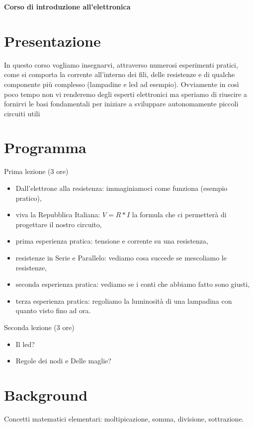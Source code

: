 \documentclass[a4paper,11pt]{article}
\begin{document}
	\pagestyle{empty}
	\begin{flushright}
		\begin{figure}[!h]
		\end{figure}
	\end{flushright}
	\begin{center}
		\textbf{\Huge Corso di introduzione all'elettronica}\\	
	\end{center}

	\section{Presentazione} %
	\label{sec:presentazione}
		In questo corso vogliamo insegnarvi, attraverso numerosi esperimenti pratici, come si comporta la corrente all'interno dei fili, delle resistenze e di qualche componente più complesso (lampadine e led ad esempio). Ovviamente in così poco tempo non vi renderemo degli esperti elettronici ma speriamo di riuscire a fornirvi le basi fondamentali per iniziare a sviluppare autonomamente piccoli circuiti utili 

	\section{Programma} %
	\label{sec:programma}
		\large Prima lezione (3 ore)
		\begin{itemize}
			\item Dall'elettrone alla resistenza: immaginiamoci come funziona (esempio pratico),
			\item viva la Repubblica Italiana: $V=R*I$ la formula che ci permetterà di progettare il nostro circuito,
			\item prima esperienza pratica: tensione e corrente su una resistenza,
			\item resistenze in Serie e Parallelo: vediamo cosa succede se mescoliamo le resistenze,
			\item seconda esperienza pratica: vediamo se i conti che abbiamo fatto sono giusti,
			\item terza esperienza pratica: regoliamo la luminosità di una lampadina con quanto visto fino ad ora.
		\end{itemize}
		\large Seconda lezione (3 ore)
		\begin{itemize}
			\item Il led?
			\item Regole dei nodi e Delle maglie?
		\end{itemize}
	
	\section{Background} %
	\label{sec:background}
		Concetti matematici elementari: moltipicazione, somma, divisione, sottrazione.
\end{document}
